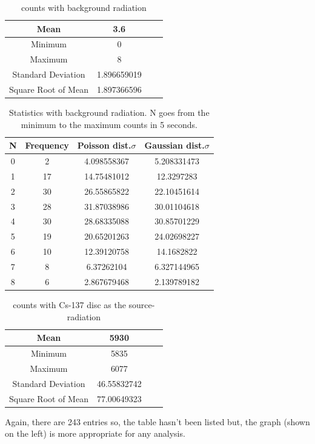 \documentclass[twocolumn]{article}
\begin{document}
\begin{table}[h!]
  \centering
  \caption{counts with background radiation}
  \begin{tabular}{|c|c|c|c|}
    \hline
    Mean & 3.6\\
    \hline
    Minimum &0\\
    \hline
    Maximum&8\\
    \hline
    Standard Deviation&1.896659019\\
    \hline
    Square Root of Mean &1.897366596\\
    \hline
  \end{tabular}
\end{table}


\begin{table}[h!]
  \centering
  \caption{Statistics with background radiation. N goes from the minimum to the maximum counts in 5 seconds.}
  \begin{tabular}{|c|c|c|c|}
    \hline
    \textbf{N} & \textbf{Frequency} & \textbf{Poisson dist.$\sigma$} & \textbf{Gaussian dist.$\sigma$} \\
    \hline
    0 & 2 & 4.098558367 & 5.208331473 \\
    \hline
    1 & 17 & 14.75481012 & 12.3297283 \\
    \hline
    2 & 30 & 26.55865822 & 22.10451614 \\
    \hline
    3 & 28 & 31.87038986 & 30.01104618 \\
    \hline
    4 & 30 & 28.68335088 & 30.85701229 \\
    \hline
    5 & 19 & 20.65201263 & 24.02698227 \\
    \hline
    6 & 10 & 12.39120758 & 14.1682822 \\
    \hline
    7 & 8 & 6.37262104 & 6.327144965 \\
    \hline
    8 & 6 & 2.867679468 & 2.139789182 \\
    \hline
  \end{tabular}
\end{table}

\begin{table}[h!]
  \centering
  \caption{counts with Cs-137 disc as the source-radiation}
  \begin{tabular}{|c|c|c|c|}
    \hline
    Mean & 5930\\
    \hline
    Minimum &5835\\
    \hline
    Maximum&6077\\
    \hline
    Standard Deviation&46.55832742\\
    \hline
    Square Root of Mean &77.00649323\\
    \hline
  \end{tabular}
\end{table}
Again, there are 243 entries so, the table hasn't been listed but, the graph (shown on the left) is more appropriate for any analysis.\\
\end{document}
